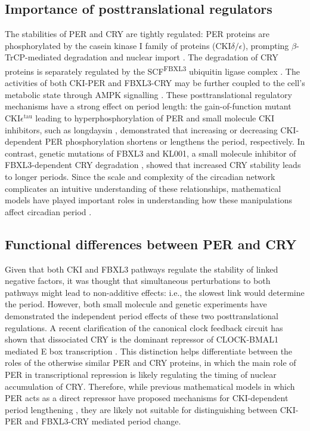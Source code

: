 \subsection{Importance of posttranslational regulators}
The stabilities of PER and CRY are tightly regulated: PER proteins are phosphorylated by the casein kinase I family of proteins (CKI$\delta/\epsilon$), prompting $\beta$-TrCP-mediated degradation \cite{Reischl2007} and nuclear import \cite{Takano2004}. 
The degradation of CRY proteins is separately regulated by the SCF\textsuperscript{FBXL3} ubiquitin ligase complex \cite{Busino2007, Godinho2007, Siepka2007}. 
The activities of both CKI-PER and FBXL3-CRY may be further coupled to the cell's metabolic state through AMPK signalling \cite{Lee2013}. 
These posttranslational regulatory mechanisms have a strong effect on period length: the gain-of-function mutant CKI$\epsilon^\mathrm{tau}$ leading to hyperphosphorylation of PER \cite{Gallego2006} and small molecule CKI inhibitors, such as longdaysin \cite{Hirota2010}, demonstrated that increasing or decreasing CKI-dependent PER phosphorylation shortens or lengthens the period, respectively. 
In contrast, genetic mutations of FBXL3 \cite{Godinho2007, Siepka2007} and KL001, a small molecule inhibitor of FBXL3-dependent CRY degradation \cite{Hirota2012}, showed that increased CRY stability leads to longer periods. 
Since the scale and complexity of the circadian network complicates an intuitive understanding of these relationships, mathematical models have played important roles in understanding how these manipulations affect circadian period \cite{Gallego2006, Hirota2012, Reischl2007}.

\subsection{Functional differences between PER and CRY}
Given that both CKI and FBXL3 pathways regulate the stability of linked negative factors, it was thought that simultaneous perturbations to both pathways might lead to non-additive effects: i.e., the slowest link would determine the period. 
 However, both small molecule \cite{Hirota2012} and genetic experiments \cite{Maywood2011} have demonstrated the independent period effects of these two posttranslational regulations. 
A recent clarification of the canonical clock feedback circuit has shown that dissociated CRY is the dominant repressor of CLOCK-BMAL1 mediated E box transcription \cite{Ye2011}. 
This distinction helps differentiate between the roles of the otherwise similar PER and CRY proteins, in which the main role of PER in transcriptional repression is likely regulating the timing of nuclear accumulation of CRY. 
Therefore, while previous mathematical models in which PER acts as a direct repressor have proposed mechanisms for CKI-dependent period lengthening \cite{Gallego2006, Vanselow2006}, they are likely not suitable for distinguishing between CKI-PER and FBXL3-CRY mediated period change.

